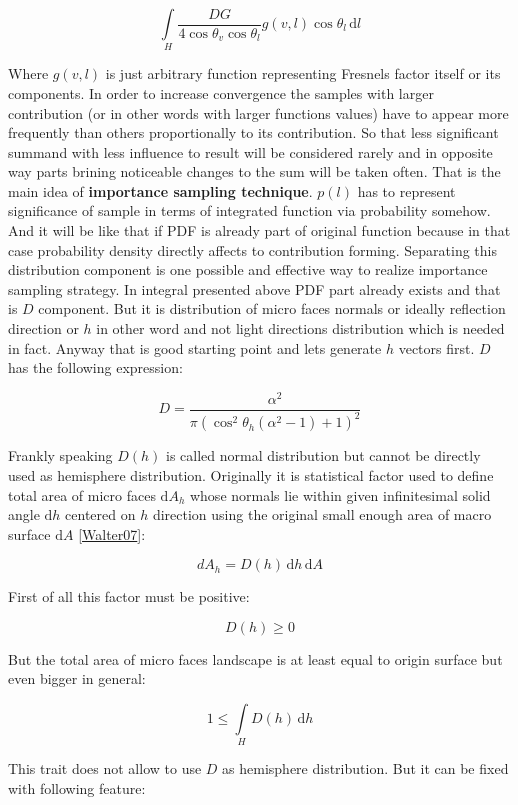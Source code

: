 \[\int\limits_H \frac{DG}{4\cos\theta_v \cos\theta_l} g(v, l) \cos\theta_l\, \mathrm{d}l\]

Where $g(v, l)$ is just arbitrary function representing Fresnel\textquotesingle{}s factor itself or its components. In order to increase convergence the samples with larger contribution (or in other words with larger function\textquotesingle{}s values) have to appear more frequently than others proportionally to its contribution. So that less significant summand with less influence to result will be considered rarely and in opposite way parts brining noticeable changes to the sum will be taken often. That is the main idea of {\bfseries importance sampling technique}. $p(l)$ has to represent significance of sample in terms of integrated function via probability somehow. And it will be like that if P\+DF is already part of original function because in that case probability density directly affects to contribution forming. Separating this distribution component is one possible and effective way to realize importance sampling strategy. In integral presented above P\+DF part already exists and that is $D$ component. But it is distribution of micro faces normals or ideally reflection direction or $h$ in other word and not light directions distribution which is needed in fact. Anyway that is good starting point and lets generate $h$ vectors first. $D$ has the following expression\+:

\[D=\frac{\alpha^2}{\pi(\cos^2\theta_h(\alpha^2-1) + 1)^2}\]

Frankly speaking $D(h)$ is called normal distribution but cannot be directly used as hemisphere distribution. Originally it is statistical factor used to define total area of micro faces $\mathrm{d}A_h$ whose normals lie within given infinitesimal solid angle $\mathrm{d}h$ centered on $h$ direction using the original small enough area of macro surface $\mathrm{d}A$ \mbox{[}\hyperlink{specification__pbr_math_Walter07}{Walter07}\mbox{]}\+:

\[dA_h = D(h)\,\mathrm{d}h\, \mathrm{d}A\]

First of all this factor must be positive\+:

\[D(h) \geq 0\]

But the total area of micro faces landscape is at least equal to origin surface but even bigger in general\+:

\[1 \leq \int\limits_H D(h)\, \mathrm{d}h\]

This trait does not allow to use $D$ as hemisphere distribution. But it can be fixed with following feature\+:

